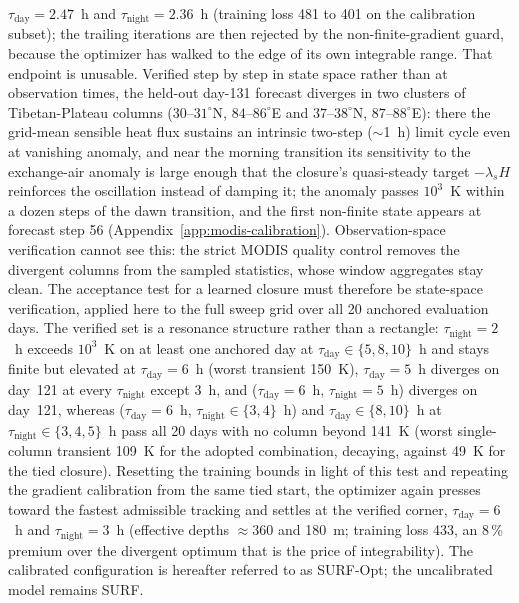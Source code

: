 $\tau_{\mathrm{day}} = 2.47$~h and $\tau_{\mathrm{night}} = 2.36$~h (training
loss 481 to 401 on the calibration subset); the trailing iterations are
then rejected by the non-finite-gradient guard, because the optimizer has
walked
to the edge of its own integrable range. That endpoint is unusable.
Verified step by step in state space rather than at observation times, the
held-out day-131 forecast diverges in two clusters of Tibetan-Plateau
columns ($30$--$31^\circ$N, $84$--$86^\circ$E and $37$--$38^\circ$N,
$87$--$88^\circ$E): there the grid-mean sensible heat
flux sustains an intrinsic two-step ($\sim$1~h) limit cycle even at
vanishing anomaly, and near the morning transition its sensitivity to the
exchange-air anomaly is large enough
that the closure's quasi-steady target $-\lambda_s H$ reinforces the
oscillation instead of damping it; the anomaly passes $10^{3}$~K within a
dozen steps of the dawn transition, and the first non-finite state appears
at forecast step 56 (Appendix~\ref{app:modis-calibration}).
Observation-space verification cannot see this: the strict MODIS quality
control removes the divergent columns from the sampled statistics, whose
window aggregates stay clean. The acceptance test for a learned closure
must therefore be state-space verification, applied here to the full sweep
grid over all 20 anchored evaluation days. The verified set is a resonance
structure rather than a rectangle: $\tau_{\mathrm{night}} = 2$~h
exceeds $10^{3}$~K on at least one anchored day at
$\tau_{\mathrm{day}} \in \{5, 8, 10\}$~h and stays finite but elevated at
$\tau_{\mathrm{day}} = 6$~h (worst transient 150~K), $\tau_{\mathrm{day}} =
5$~h diverges on day~121 at every $\tau_{\mathrm{night}}$ except 3~h, and
($\tau_{\mathrm{day}} = 6$~h, $\tau_{\mathrm{night}} = 5$~h) diverges on
day~121, whereas ($\tau_{\mathrm{day}} = 6$~h, $\tau_{\mathrm{night}} \in
\{3, 4\}$~h) and $\tau_{\mathrm{day}} \in \{8, 10\}$~h at
$\tau_{\mathrm{night}} \in \{3, 4, 5\}$~h pass
all 20 days with no column beyond 141~K (worst single-column
transient 109~K for the adopted combination, decaying, against 49~K for
the tied closure). Resetting
the training bounds in light of this test and repeating the gradient
calibration from the same tied start, the optimizer again presses toward
the fastest admissible tracking and settles at the verified corner,
$\tau_{\mathrm{day}} = 6$~h and $\tau_{\mathrm{night}} = 3$~h (effective
depths $\approx$360 and 180~m; training loss 433, an 8\,\% premium over
the divergent optimum that is the price of integrability). The calibrated
configuration is hereafter referred to as SURF-Opt; the uncalibrated model
remains SURF.

